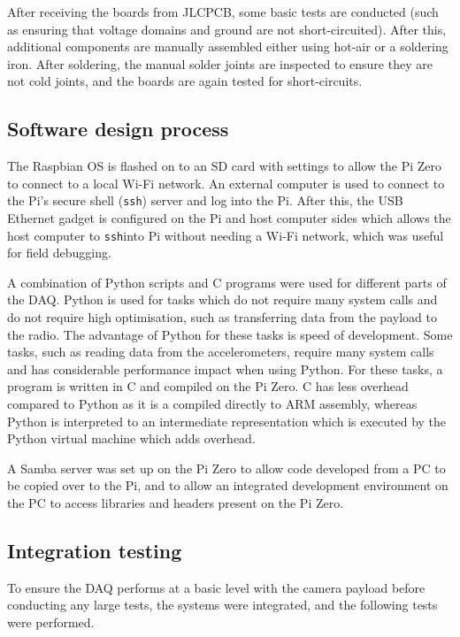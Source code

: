 \documentclass[draft]{report}
\newcommand{\ssh}{\texttt{ssh}}
\begin{document}
After receiving the boards from JLCPCB, some basic tests are conducted (such as ensuring that voltage domains and ground are not short-circuited). After this, additional components are manually assembled either using hot-air or a soldering iron. After soldering, the manual solder joints are inspected to ensure they are not cold joints, and the boards are again tested for short-circuits.

\subsection{Software design process}

The Raspbian OS is flashed on to an SD card with settings to allow the Pi Zero to connect to a local Wi-Fi network. An external computer is used to connect to the Pi's secure shell (\ssh) server and log into the Pi. After this, the USB Ethernet gadget is configured on the Pi and host computer sides which allows the host computer to \ssh into Pi without needing a Wi-Fi network, which was useful for field debugging.

A combination of Python scripts and C programs were used for different parts of the DAQ. Python is used for tasks which do not require many system calls and do not require high optimisation, such as transferring data from the payload to the radio. The advantage of Python for these tasks is speed of development.  Some tasks, such as reading data from the accelerometers, require many system calls and has considerable performance impact when using Python. For these tasks, a program is written in C and compiled on the Pi Zero. C has less overhead compared to Python as it is a compiled directly to ARM assembly, whereas Python is interpreted to an intermediate representation which is executed by the Python virtual machine which adds overhead.

A Samba server was set up on the Pi Zero to allow code developed from a PC to be copied over to the Pi, and to allow an integrated development environment on the PC to access libraries and headers present on the Pi Zero.

\subsection{Integration testing}

To ensure the DAQ performs at a basic level with the camera payload before conducting any large tests, the systems were integrated, and the following tests were performed.
\end{document}
